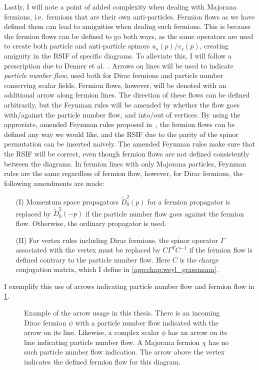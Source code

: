 \documentclass[../main.tex]{subfiles}
\begin{document}
Lastly, I will note a point of added complexity when dealing with Majorana fermions, i.e.\ fermions that are their own anti-particles.
Fermion flows as we have defined them can lead to amiguities when dealing such fermions.
This is because the fermion flows can be defined to go both ways, as the same operators are used to create both particle and anti-particle spinors \(u_s(p)/v_s(p)\), creating amiguity in the RSIF of specific diagrams.
To alleviate this, I will follow a prescription due to Denner et al.~\cite{Denner:1992vza}.
Arrows on lines will be used to indicate \emph{particle number flow}, used both for Dirac fermions and particle number conserving scalar fields.
Fermion flows, however, will be denoted with an additional arrow along fermion lines.
The direction of these flows can be defined arbitrarily, but the Feynman rules will be amended by whether the flow goes with/against the particle number flow, and into/out of vertices.
By using the approriate, amended Feynman rules proposed in~\cite{Denner:1992vza}, the fermion flows can be defined any way we would like, and the RSIF due to the parity of the spinor permutation can be inserted naively.
The amended Feynman rules make sure that the RSIF will be correct, even though fermion flows are not defined consistently between the diagrams.
In fermion lines with only Majorana particles, Feynman rules are the same regardless of fermion flow, however, for Dirac fermions, the following amendments are made:
\begin{itemize}
  \item [(I)] Momentum space propagators \(\tilde{D}_0^2(p)\) for a fermion propagator is replaced by \(\tilde{D}_0^2(-p)\) if the particle number flow goes against the fermion flow. Otherwise, the ordinary propagator is used.
  \item [(II)] For vertex rules including Dirac fermions, the spinor operator \(\Gamma\) associated with the vertex must be replaced by \(C\Gamma^T C^{-1}\) if the fermion flow is defined contrary to the particle number flow. Here \(C\) is the charge conjugation matrix, which I define in \cref{app:chap:weyl_grassmann}.
\end{itemize}

I exemplify this use of arrows indicating particle number flow and fermion flow in \cref{qft:fig:feynman_flow}.

\begin{figure}[ht!]
  \centering
  \caption{Example of the arrow usage in this thesis.
    There is an incoming Dirac fermion \(\psi\) with a particle number flow indicated with the arrow on its line.
    Likewise, a complex scalar \(\phi\) has an arrow on its line indicating particle number flow.
    A Majorana fermion \(\chi\) has no such particle number flow indication.
    The arrow above the vertex indicates the defined fermion flow for this diagram.}
  \label{qft:fig:feynman_flow}
\end{figure}
\end{document}
